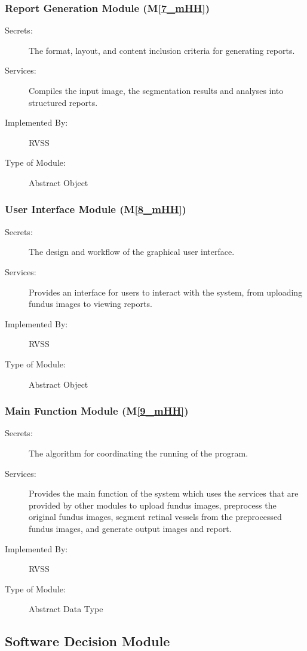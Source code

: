\documentclass[12pt, titlepage]{article}
\newcommand{\mref}[1]{M\ref{#1}}
\begin{document}
\subsubsection{Report Generation Module (\mref{7_mHH})}
\begin{description}
\item[Secrets:] The format, layout, and content inclusion criteria for generating reports.
\item[Services:] Compiles the input image, the segmentation results and analyses into structured reports.
\item[Implemented By:] RVSS
\item[Type of Module:] Abstract Object
\end{description}

\subsubsection{User Interface Module (\mref{8_mHH})}
\begin{description}
\item[Secrets:] The design and workflow of the graphical user interface.
\item[Services:] Provides an interface for users to interact with the system, from uploading fundus images to viewing reports.
\item[Implemented By:] RVSS
\item[Type of Module:] Abstract Object
\end{description}

\subsubsection{Main Function Module (\mref{9_mHH})}
\begin{description}
\item[Secrets:] The algorithm for coordinating the running of the program.
\item[Services:] Provides the main function of the system which uses the services that are provided by other modules to upload fundus images, preprocess the original fundus images, segment retinal vessels from the preprocessed fundus images, and generate output images and report. 
\item[Implemented By:] RVSS
\item[Type of Module:] Abstract Data Type
\end{description}

\subsection{Software Decision Module}
\end{document}
